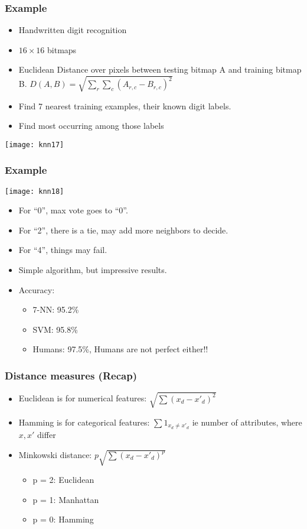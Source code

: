 \begin{frame}[fragile]\frametitle{Example}
\begin{itemize}
\item Handwritten digit recognition
\item $16 \times 16$ bitmaps
\item Euclidean Distance over pixels between testing bitmap A and training bitmap B. $D(A,B) = \sqrt{\sum_r \sum_c (A_{r,c} - B_{r,c})^2}$
\item Find 7 nearest training examples, their known digit labels. 
\item Find most occurring among those labels
\end{itemize}
\begin{center}
\texttt{[image: knn17]}
\end{center}
\end{frame}

\begin{frame}[fragile]\frametitle{Example}
\begin{center}
\texttt{[image: knn18]}
\end{center}
\begin{itemize}
\item For ``0'', max vote goes to ``0''.
\item For ``2'', there is a tie, may add more neighbors to decide.
\item For ``4'', things may fail.
\item Simple algorithm, but impressive results. 
\item Accuracy:
\begin{itemize}
\item 7-NN: 95.2\%
\item SVM: 95.8\%
\item Humans: 97.5\%, Humans are not perfect either!!
\end{itemize}
\end{itemize}
\end{frame}

\begin{frame}[fragile]\frametitle{Distance measures  (Recap)}
\begin{itemize}
\item Euclidean is for numerical features: $\sqrt{\sum (x_d - x'_d)^2}$
\item Hamming is for categorical features: $\sum 1_{x_d \neq x'_d}$ ie  number of attributes, where $x, x'$  differ 
\item Minkowski distance:  $p\sqrt{\sum (x_d - x'_d)^p}$
	\begin{itemize}
	\item p = 2: Euclidean 
	\item p = 1: Manhattan
	\item p = 0: Hamming 
	\end{itemize}
\end{itemize}
\end{frame}

